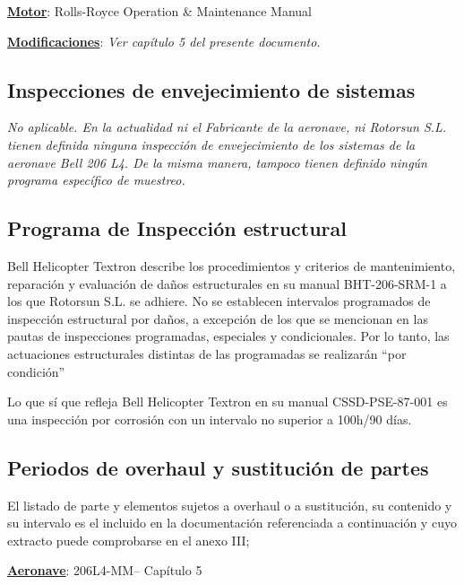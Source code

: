 \documentclass[
]{article}
\begin{document}
\textbf{\ul{Motor}}: Rolls-Royce Operation \& Maintenance Manual

\textbf{\ul{Modificaciones}}: \emph{Ver capítulo 5 del presente
documento.}

\hypertarget{inspecciones-de-envejecimiento-de-sistemas}{%
\subsection{Inspecciones de envejecimiento de
sistemas}\label{inspecciones-de-envejecimiento-de-sistemas}}

\emph{No aplicable. En la actualidad ni el Fabricante de la aeronave, ni
Rotorsun S.L. tienen definida ninguna inspección de envejecimiento de
los sistemas de la aeronave Bell 206 L4. De la misma manera, tampoco
tienen definido ningún programa específico de muestreo.}

\hypertarget{programa-de-inspecciuxf3n-estructural}{%
\subsection{Programa de Inspección
estructural}\label{programa-de-inspecciuxf3n-estructural}}

Bell Helicopter Textron describe los procedimientos y criterios de
mantenimiento, reparación y evaluación de daños estructurales en su
manual BHT-206-SRM-1 a los que Rotorsun S.L. se adhiere. No se
establecen intervalos programados de inspección estructural por daños, a
excepción de los que se mencionan en las pautas de inspecciones
programadas, especiales y condicionales. Por lo tanto, las actuaciones
estructurales distintas de las programadas se realizarán ``por
condición''

Lo que sí que refleja Bell Helicopter Textron en su manual
CSSD-PSE-87-001 es una inspección por corrosión con un intervalo no
superior a 100h/90 días.

\hypertarget{periodos-de-overhaul-y-sustituciuxf3n-de-partes}{%
\subsection{Periodos de overhaul y sustitución de
partes}\label{periodos-de-overhaul-y-sustituciuxf3n-de-partes}}

El listado de parte y elementos sujetos a overhaul o a sustitución, su
contenido y su intervalo es el incluido en la documentación referenciada
a continuación y cuyo extracto puede comprobarse en el anexo III;

\textbf{\ul{Aeronave}}: 206L4-MM-- Capítulo 5
\end{document}
